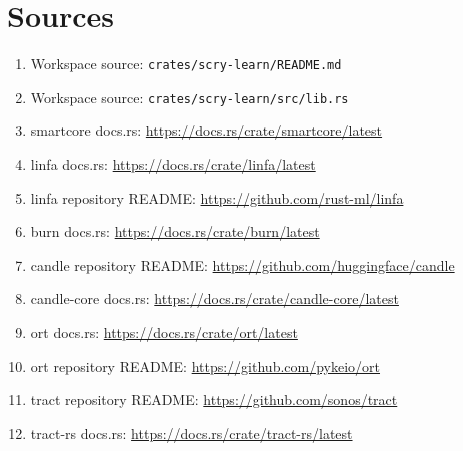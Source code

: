 \documentclass[11pt]{article}
\begin{document}
\section*{Sources}
\small
\begin{enumerate}[leftmargin=1.3em]
\item Workspace source: \texttt{crates/scry-learn/README.md}
\item Workspace source: \texttt{crates/scry-learn/src/lib.rs}
\item smartcore docs.rs: \url{https://docs.rs/crate/smartcore/latest}
\item linfa docs.rs: \url{https://docs.rs/crate/linfa/latest}
\item linfa repository README: \url{https://github.com/rust-ml/linfa}
\item burn docs.rs: \url{https://docs.rs/crate/burn/latest}
\item candle repository README: \url{https://github.com/huggingface/candle}
\item candle-core docs.rs: \url{https://docs.rs/crate/candle-core/latest}
\item ort docs.rs: \url{https://docs.rs/crate/ort/latest}
\item ort repository README: \url{https://github.com/pykeio/ort}
\item tract repository README: \url{https://github.com/sonos/tract}
\item tract-rs docs.rs: \url{https://docs.rs/crate/tract-rs/latest}
\end{enumerate}
\end{document}
